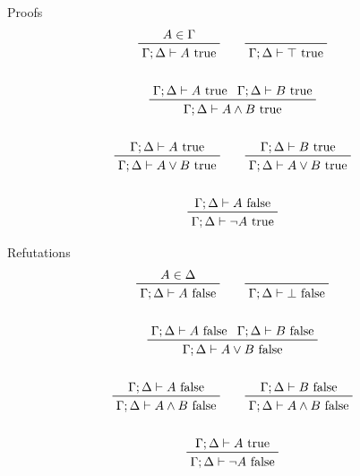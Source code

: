 \documentclass[a4paper,11pt]{article}
\begin{document}
{{        \begin{minipage}[t]{0.49\textwidth}
        \centering
        Proofs
        \begin{gather*}
        \prftree[r]{}
        {A\in\Gamma}
        {\Gamma;\Delta \vdash A \text{ true}}
        \qquad
        \prftree[r]{}
        {\Gamma;\Delta \vdash \top \text{ true}}
        \\
        \\
        \prftree[r]{}
        {\Gamma;\Delta\vdash A\text{ true}}
        {\Gamma;\Delta\vdash B\text{ true}}
        {\Gamma;\Delta\vdash A \wedge B\text{ true}}
        \\
        \\
        \prftree[r]{}
        {\Gamma;\Delta\vdash A\text{ true}}
        {\Gamma;\Delta\vdash A \vee B\text{ true}}
        \qquad
        \prftree[r]{}
        {\Gamma;\Delta\vdash B\text{ true}}
        {\Gamma;\Delta\vdash A \vee B\text{ true}}
        \\
        \\
        \prftree[r]{}
        {\Gamma;\Delta\vdash A\text{ false}}
        {\Gamma;\Delta\vdash \neg A\text{ true}}
        \end{gather*}
        \end{minipage}
        \begin{minipage}[t]{0.49\textwidth}
        \centering
        Refutations
        \begin{gather*}
        \prftree[r]{}
        {A\in\Delta}
        {\Gamma;\Delta \vdash A \text{ false}}
        \qquad
        \prftree[r]{}
        {\Gamma;\Delta \vdash \bot \text{ false}}
        \\
        \\
        \prftree[r]{}
        {\Gamma;\Delta\vdash A\text{ false}}
        {\Gamma;\Delta\vdash B\text{ false}}
        {\Gamma;\Delta\vdash A \vee B\text{ false}}
        \\
        \\
        \prftree[r]{}
        {\Gamma;\Delta\vdash A\text{ false}}
        {\Gamma;\Delta\vdash A \wedge B\text{ false}}
        \qquad
        \prftree[r]{}
        {\Gamma;\Delta\vdash B\text{ false}}
        {\Gamma;\Delta\vdash A \wedge B\text{ false}}
        \\
        \\
        \prftree[r]{}
        {\Gamma;\Delta\vdash A\text{ true}}
        {\Gamma;\Delta\vdash \neg A\text{ false}}
        \end{gather*}
        \end{minipage}

}}
\end{document}
